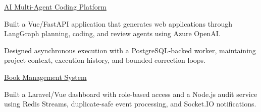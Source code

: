 
{\intersemibold\href{https://guada-franco.pages.dev/projects/ai-coding-agent-pipeline}{AI Multi-Agent Coding Platform}}

\begin{jobitems}
\item Built a Vue/FastAPI application that generates web applications through LangGraph planning, coding, and review agents using Azure OpenAI.
\item Designed asynchronous execution with a PostgreSQL-backed worker, maintaining project context, execution history, and bounded correction loops.
\end{jobitems}

{\intersemibold\href{https://guada-franco.pages.dev/projects/book-management-system}{Book Management System}}

\begin{jobitems}
\item Built a Laravel/Vue dashboard with role-based access and a Node.js audit service using Redis Streams, duplicate-safe event processing, and Socket.IO notifications.
\end{jobitems}
